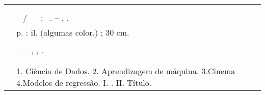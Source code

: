 %
\begin{fichacatalografica}
	\hspace{-1.4cm}
	\imprimirnotaautorizacao \\ \\
	\vspace*{\fill}					%
	\begin{center}					%
		\imprimirnotabib \\
\begin{table}[htb]
	\scriptsize
	\centering	
	\begin{tabular}{|p{0.9cm} p{8.7cm}|}
		\hline
	      & \\
		  &	  \imprimirautorficha     \\
		
		 \imprimircutter & 
							\hspace{0.4cm}\imprimirtitulo~  / ~\imprimirautor~ ;  ~\imprimirorientadorcorpoficha. -- 	\imprimirlocal, \imprimirdata.   \\
		
		  &  %
		
			\hspace{0.4cm}\pageref{LastPage} p. : il. (algumas color.) ; 30 cm.\\ 
		  & \\
		  & 
		    \hspace{0.4cm}\imprimirnotaficha ~--~ 
						  \imprimirunidademin, 
						  \imprimiruniversidademin, 
		                  \imprimirdata. \\ 
		  & \\                 
		  & \\ 
		  & \hspace{0.4cm}1. Ciência de Dados. 2. Aprendizagem de máquina. 3.Cinema 4.Modelos de regressão.  I. \imprimirorientadorficha. 
		   II. Título. \\
	

\end{tabular}
\end{table}
\end{center}
\end{fichacatalografica}
